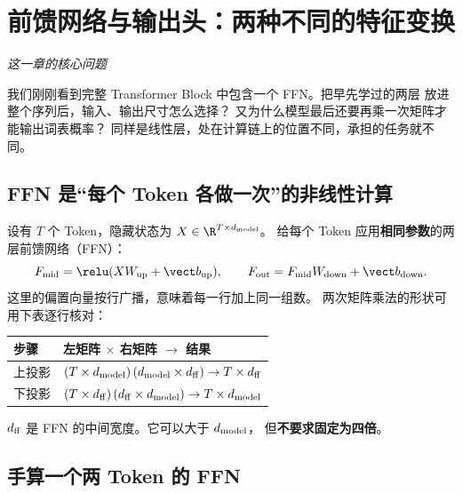 \chapterrule
\section{前馈网络与输出头：两种不同的特征变换}
\label{intro:10b-ffn-output-head}

\begin{idea}
\noindent\emph{这一章的核心问题}\par

我们刚刚看到完整 Transformer Block 中包含一个 FFN。把早先学过的两层  放进整个序列后，输入、输出尺寸怎么选择？
又为什么模型最后还要再乘一次矩阵才能输出词表概率？
同样是线性层，处在计算链上的位置不同，承担的任务就不同。
\end{idea}

\subsection{FFN 是“每个 Token 各做一次”的非线性计算}
\label{concept:ffn}

设有 $T$ 个 Token，隐藏状态为
$X\in\R^{T\times d_{\rm model}}$。
给每个 Token 应用\textbf{相同参数}的两层前馈网络（FFN）：
\begin{equation}
F_{\rm mid}=\relu(XW_{\rm up}+\vect b_{\rm up}),\qquad
F_{\rm out}=F_{\rm mid}W_{\rm down}+\vect b_{\rm down}.
\label{eq:ffn-batched}
\end{equation}
这里的偏置向量按行广播，意味着每一行加上同一组数。
两次矩阵乘法的形状可用下表逐行核对：
\begin{center}\small
{}
\begin{tabularx}{\linewidth}{@{}>{\raggedright\arraybackslash}p{25mm}>{\raggedright\arraybackslash}X@{}}
\toprule
步骤 & 左矩阵 $\times$ 右矩阵 $\to$ 结果\\\midrule
上投影 & $(T\times d_{\rm model})\,(d_{\rm model}\times d_{\rm ff})\to T\times d_{\rm ff}$\\
下投影 & $(T\times d_{\rm ff})\,(d_{\rm ff}\times d_{\rm model})\to T\times d_{\rm model}$\\
\bottomrule
\end{tabularx}
\end{center}
$d_{\rm ff}$ 是 FFN 的中间宽度。它可以大于 $d_{\rm model}$，
但\textbf{不要求固定为四倍}。

\subsection{手算一个两 Token 的 FFN}

